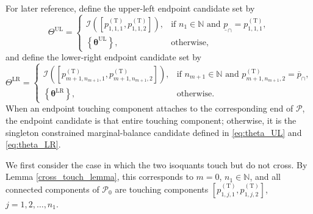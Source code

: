 \documentclass[a4paper,12pt]{article}
\begin{document}
For later reference, define the upper-left endpoint candidate set by
\begin{equation}
\Theta^{\text{UL}}
=
\begin{cases}
\mathcal{I}\left(\left[p^{\left(\text{T}\right)}_{1,1,1},p^{\left(\text{T}\right)}_{1,1,2}\right]\right),&\text{if }n_1\in\mathbb{N}\text{ and }\underline{p}_{\cap}=p^{\left(\text{T}\right)}_{1,1,1},\\
\left\{{\bm\theta}^{\text{UL}}\right\},&\text{otherwise},
\end{cases}
\label{eq:ThetaUL}
\end{equation}
and define the lower-right endpoint candidate set by
\begin{equation}
\Theta^{\text{LR}}
=
\begin{cases}
\mathcal{I}\left(\left[p^{\left(\text{T}\right)}_{m+1,n_{m+1},1},p^{\left(\text{T}\right)}_{m+1,n_{m+1},2}\right]\right),
&
\text{if }n_{m+1}\in\mathbb{N}\text{ and }p^{\left(\text{T}\right)}_{m+1,n_{m+1},2}=\overline{p}_{\cap},\\
\left\{{\bm\theta}^{\text{LR}}\right\},&\text{otherwise}.
\end{cases}
\label{eq:ThetaLR}
\end{equation}
When an endpoint touching component attaches to the corresponding end of $\mathcal{P}$, the endpoint candidate is that entire touching component; otherwise, it is the singleton constrained marginal-balance candidate defined in \eqref{eq:theta_UL} and \eqref{eq:theta_LR}.

We first consider the case in which the two isoquants touch but do not cross. By Lemma \ref{cross_touch_lemma}, this corresponds to $m=0$, $n_1\in\mathbb{N}$, and all connected components of $\mathcal{P}_0$ are touching components $\left[p^{\left(\text{T}\right)}_{1,j,1},p^{\left(\text{T}\right)}_{1,j,2}\right]$, $j=1,2,\dots,n_1$.
\end{document}
